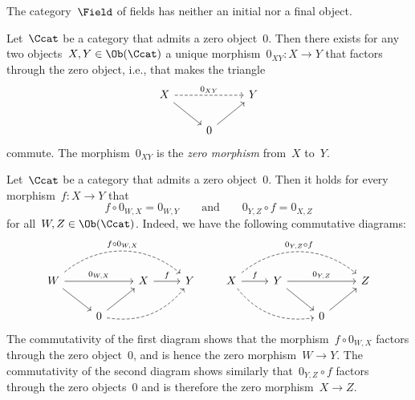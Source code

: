\begin{example*}
  The category~$\Field$ of fields has neither an initial nor a final object.
\end{example*}


\begin{remarkdefinition}
  Let~$\Ccat$ be a category that admits a zero object~$0$.
  Then there exists for any two objects~$X, Y \in \Ob(\Ccat)$ a unique morphism~$0_{XY} \colon X \to Y$ that factors through the zero object, i.e., that makes the triangle
  \[
    \begin{tikzcd}
        X
        \arrow{dr}
        \arrow[dashed]{rr}[above]{0_{XY}}
      & {}
      & Y
      \\
        {}
      & 0
        \arrow{ur}
      & {}
    \end{tikzcd}
  \]
  commute.
  The morphism~$0_{XY}$ is the \emph{zero morphism} from~$X$ to~$Y$.
\end{remarkdefinition}


\begin{remark*}
  Let~$\Ccat$ be a category that admits a zero object~$0$.
  Then it holds for every morphism~$f \colon X \to Y$ that
  \[
      f \circ 0_{W,X}
    = 0_{W,Y}
    \qquad\text{and}\qquad
      0_{Y,Z} \circ f
    = 0_{X,Z}
  \]
  for all~$W, Z \in \Ob(\Ccat)$.
  Indeed, we have the following commutative diagrams:
  \[
    \begin{tikzcd}
        W
        \arrow[dashed, bend left = 40]{rrr}[above]{f \circ {0_{W,X}}}
        \arrow{rr}[above]{0_{W,X}}
        \arrow{dr}
      & {}
      & X
        \arrow{r}[above]{f}
      & Y
      \\
        {}
      & 0
        \arrow{ur}
        \arrow[dashed, bend right]{urr}
      & {}
      & {}
    \end{tikzcd}
    \qquad
    \begin{tikzcd}
        X
        \arrow[dashed, bend left = 40]{rrr}[above]{{0_{Y,Z}} \circ f}
        \arrow{r}[above]{f}
        \arrow[dashed, bend right]{drr}
      & Y
        \arrow{rr}[above]{0_{Y,Z}}
        \arrow{dr}
      & {}
      & Z
      \\
        {}
      & {}
      & 0
        \arrow{ur}
      & {}
    \end{tikzcd}
  \]
  The commutativity of the first diagram shows that the morphism~$f \circ 0_{W,X}$ factors through the zero object~$0$, and is hence the zero morphism~$W \to Y$.
  The commutativity of the second diagram shows similarly that~$0_{Y,Z} \circ f$ factors through the zero objects~$0$ and is therefore the zero morphism~$X \to Z$.
\end{remark*}









